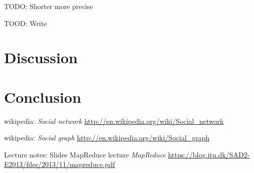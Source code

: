 \documentclass{article}
\begin{document}
TODO: Shorter more precise


TOOD: Write


\section{Discussion}

\section{Conclusion}

\begin{thebibliography}{1}

    wikipedia:
    \emph{Social network}
    \url{http://en.wikipedia.org/wiki/Social_network}

    wikipedia:
    \emph{Social graph}
    \url{http://en.wikipedia.org/wiki/Social_graph}

    Lecture notes: Slides MapReduce lecture
    \emph{MapReduce}
    \url{https://blog.itu.dk/SAD2-E2013/files/2013/11/mapreduce.pdf}
    
\end{thebibliography}
\end{document}
